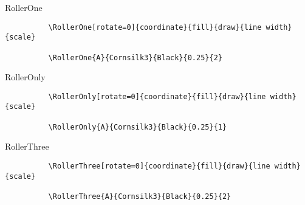 \documentclass[9pt,xcolor={svgnames, x11names}]{beamer}
\begin{document}

    \begin{frame}[fragile]{RollerOne}

        \footnotesize
        \begin{verbatim}
          \RollerOne[rotate=0]{coordinate}{fill}{draw}{line width}{scale}

          \RollerOne{A}{Cornsilk3}{Black}{0.25}{2}
        \end{verbatim}
      
        \vspace{1cm}
      
      
      \end{frame}

    \begin{frame}[fragile]{RollerOnly}

        \footnotesize
        \begin{verbatim}
          \RollerOnly[rotate=0]{coordinate}{fill}{draw}{line width}{scale}

          \RollerOnly{A}{Cornsilk3}{Black}{0.25}{1}
        \end{verbatim}
      
        \vspace{1cm}
      
      
      \end{frame}


    \begin{frame}[fragile]{RollerThree}

        \footnotesize
        \begin{verbatim}
          \RollerThree[rotate=0]{coordinate}{fill}{draw}{line width}{scale}

          \RollerThree{A}{Cornsilk3}{Black}{0.25}{2}
        \end{verbatim}
      
        \vspace{1cm}
      
      
      \end{frame}
\end{document}
